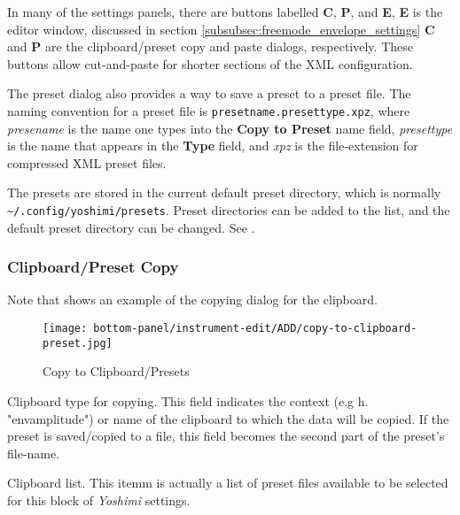    In many of the settings panels, there are buttons
   labelled \textbf{C}, \textbf{P}, and \textbf{E},
   \textbf{E} is the editor window, discussed in 
   section \ref{subsubsec:freemode_envelope_settings}
   \textbf{C} and \textbf{P} are the clipboard/preset copy and paste
   dialogs, respectively.
   These buttons allow cut-and-paste for shorter sections of the XML
   configuration.

   The preset dialog also provides a way
   to save a preset to a preset file.
   The naming convention for a preset file is
   \texttt{presetname.presettype.xpz}, where
   \textsl{presename} is the name one types into the \textbf{Copy to Preset}
   name field, \textsl{presettype} is the name that appears in the
   \textbf{Type} field, and \textsl{xpz} is the file-extension for compressed
   XML preset files.

   The presets are stored in the current default preset directory,
   which is normally
   \texttt{\textasciitilde/.config/yoshimi/presets}.
   Preset directories can be added to the list, and
   the default preset directory can be changed.
   See .

\subsubsection{Clipboard/Preset Copy}
\label{subsubsec:clipboard_copy}

   Note that 
   shows an example of the copying dialog for the clipboard.

\begin{figure}[H]
   \centering 
   \texttt{[image: bottom-panel/instrument-edit/ADD/copy-to-clipboard-preset.jpg]}
   \caption[Copy to Clipboard]{Copy to Clipboard/Presets}
   \label{fig:copy_to_clipboard} 
\end{figure}

   \setcounter{ItemCounter}{0}      %

   Clipboard type for copying.
   This field indicates the context (e.g h. "envamplitude") or name of the
   clipboard to which the data will be copied.
   If the preset is saved/copied to a file, this
   field becomes the second part of the preset's file-name.

   Clipboard list.
   This itemm is actually a list of preset files available to be selected for
   this block of \textsl{Yoshimi} settings.


